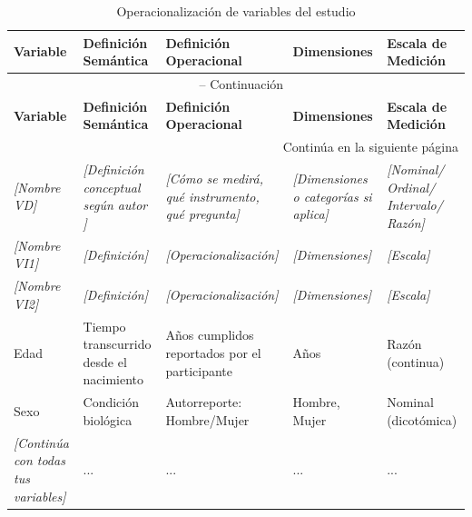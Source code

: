 \begin{longtable}{@{}p{2.5cm}p{3cm}p{3cm}p{2cm}p{2cm}@{}}
    \caption{Operacionalización de variables del estudio} \label{tab:operacionalizacion} \\
    \toprule
    \textbf{Variable} & \textbf{Definición Semántica} & \textbf{Definición Operacional} & \textbf{Dimensiones} & \textbf{Escala de Medición} \\
    \midrule
    \endfirsthead
    
    \multicolumn{5}{c}{{\tablename\ \thetable{} -- Continuación}} \\
    \toprule
    \textbf{Variable} & \textbf{Definición Semántica} & \textbf{Definición Operacional} & \textbf{Dimensiones} & \textbf{Escala de Medición} \\
    \midrule
    \endhead
    
    \midrule
    \multicolumn{5}{r}{{Continúa en la siguiente página}} \\
    \endfoot
    
    \bottomrule
    \endlastfoot
    
    \textit{[Nombre VD]} & 
    \textit{[Definición conceptual según autor \cite{ref}]} & 
    \textit{[Cómo se medirá, qué instrumento, qué pregunta]} & 
    \textit{[Dimensiones o categorías si aplica]} & 
    \textit{[Nominal/ Ordinal/ Intervalo/ Razón]} \\
    \midrule
    
    \textit{[Nombre VI1]} & 
    \textit{[Definición]} & 
    \textit{[Operacionalización]} & 
    \textit{[Dimensiones]} & 
    \textit{[Escala]} \\
    \midrule
    
    \textit{[Nombre VI2]} & 
    \textit{[Definición]} & 
    \textit{[Operacionalización]} & 
    \textit{[Dimensiones]} & 
    \textit{[Escala]} \\
    \midrule
    
    Edad & 
    Tiempo transcurrido desde el nacimiento & 
    Años cumplidos reportados por el participante & 
    Años & 
    Razón (continua) \\
    \midrule
    
    Sexo & 
    Condición biológica & 
    Autorreporte: Hombre/Mujer & 
    Hombre, Mujer & 
    Nominal (dicotómica) \\
    \midrule
    
    \textit{[Continúa con todas tus variables]} & 
    ... & 
    ... & 
    ... & 
    ... \\
    
\end{longtable}

